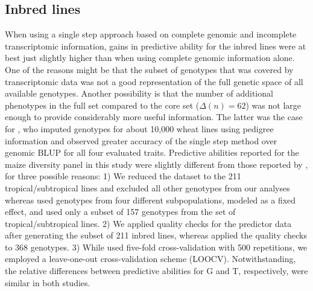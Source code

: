 \documentclass[12pt,titlepage]{article}
\begin{document}
\subsection{Inbred lines}
When using a single step approach based on complete genomic and incomplete
transcriptomic information, gains in predictive ability for the inbred lines
were at best just slightly higher than when using complete genomic information
alone.
One of the reasons might be that the subset of genotypes that was covered by
transcriptomic data was not a good representation of the full genetic space of
all available genotypes.
Another possibility is that the number of additional phenotypes in the full
set compared to the core set ($\Delta(n) = 62$) was not large enough to provide
considerably more useful information.
The latter was the case for , who imputed genotypes for about 
10,000 wheat lines using pedigree information and observed greater accuracy of
the single step method over genomic BLUP for all four evaluated traits.
Predictive abilities reported for the maize diversity panel in this study were
slightly different from those reported by , for three
possible reasons:
1) We reduced the dataset to the 211 tropical/subtropical lines and excluded 
all other genotypes from our analyses whereas  used genotypes 
from four different subpopulations, modeled as a fixed effect, and used only a 
subset of 157 genotypes from the set of tropical/subtropical lines.
2) We applied quality checks for the predictor data after generating the subset
of 211 inbred lines, whereas  applied the quality checks to 368
genotypes.
3) While  used five-fold cross-validation with 500 repetitions,
we employed a leave-one-out cross-validation scheme (LOOCV).
Notwithstanding, the relative differences between predictive abilities for G 
and T, respectively, were similar in both studies.
\end{document}

